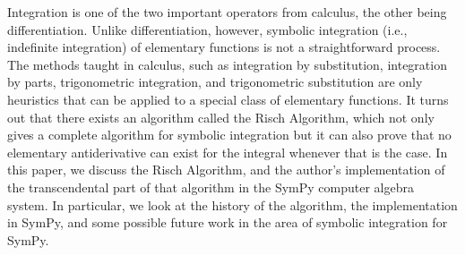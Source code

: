 Integration is one of the two important operators from calculus, the
other being differentiation.  Unlike differentiation, however, symbolic
integration (i.e., indefinite integration) of elementary functions is
not a straightforward process. The methods taught in calculus, such as
integration by substitution, integration by parts, trigonometric
integration, and trigonometric substitution are only heuristics that can
be applied to a special class of elementary functions. It turns out that
there exists an algorithm called the Risch Algorithm, which not only
gives a complete algorithm for symbolic integration but it can also
prove that no elementary antiderivative can exist for the integral
whenever that is the case. In this paper, we discuss the Risch
Algorithm, and the author's implementation of the transcendental part of
that algorithm in the SymPy computer algebra system.  In particular, we
look at the history of the algorithm, the implementation in SymPy, and
some possible future work in the area of symbolic integration for SymPy.

